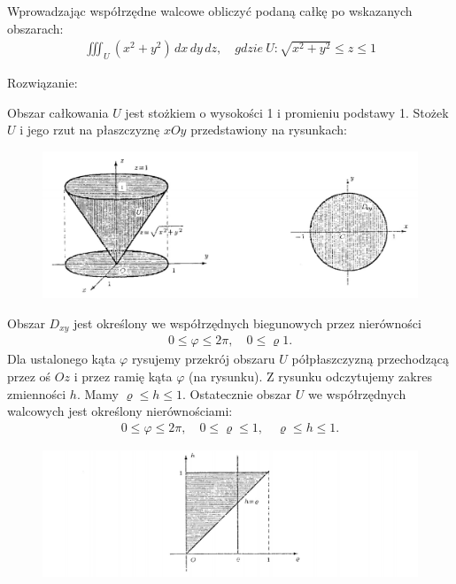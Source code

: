 \documentclass[12pt]{article}
\begin{document}
    \begin{exercise}
        Wprowadzając współrzędne walcowe obliczyć podaną całkę po wskazanych obszarach:
        \begin{align*}
            \iiint_U (x^2+y^2) \,dx\,dy\,dz, \quad gdzie \ U: \sqrt{x^2+y^2} \leq z \leq 1
        \end{align*}
    \end{exercise}

    Rozwiązanie:

    Obszar całkowania $U$ jest stożkiem o wysokości 1 i promieniu podstawy 1. Stożek $U$ i jego rzut na płaszczyznę $xOy$ przedstawiony na rysunkach:
    \begin{figure}[H]
        \includegraphics[width=\linewidth]{28_1a.jpg}
    \end{figure}

    Obszar $D_{xy}$ jest określony we współrzędnych biegunowych przez nierówności
    \begin{align*}
        0 \leq \varphi \leq 2\pi, \quad 0 \leq \varrho 1 .
    \end{align*}
    Dla ustalonego kąta $\varphi$ rysujemy przekrój obszaru $U$ półpłaszczyzną przechodzącą przez oś $Oz$ i przez ramię kąta $\varphi$ (na rysunku). Z rysunku odczytujemy zakres zmienności $h$. Mamy $\varrho \leq h \leq 1$. Ostatecznie obszar $U$ we współrzędnych walcowych jest określony nierównościami:
    \begin{align*}
        0 \leq \varphi \leq 2\pi, \quad 0 \leq \varrho \leq 1, \quad \varrho \leq h \leq 1.
    \end{align*}

    \begin{figure}[H]
        \includegraphics[width=\linewidth]{28_1b.jpg}
    \end{figure}
\end{document}
